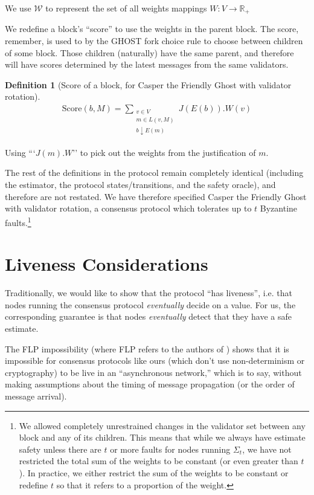 \documentclass{article}
\theoremstyle{definition}
\newtheorem{defn}{Definition}[section]
\begin{document}
We use $\mathcal{W}$ to represent the set of all weights mappings $W:V \to \mathbb{R}_+$

We redefine a block's ``score'' to use the weights in the parent block. The score, remember, is used to by the GHOST fork choice rule to choose between children of some block. Those children (naturally) have the same parent, and therefore will have scores determined by the latest messages from the same validators.

\begin{defn}[Score of a block, for Casper the Friendly Ghost with validator rotation]
\begin{align}
\text{Score}(b, M) = \sum_{\substack{v \in V \\ m \in L(v,M) \\ b \downarrow E(m)}} J(E(b)).W(v)
\end{align}
\end{defn}

Using ```$J(m).W$'' to pick out the weights from the justification of $m$.

The rest of the definitions in the protocol remain completely identical (including the estimator, the protocol states/transitions, and the safety oracle), and therefore are not restated. We have therefore specified Casper the Friendly Ghost with validator rotation, a consensus protocol which tolerates up to $t$ Byzantine faults.\footnote{We allowed completely unrestrained changes in the validator set between any block and any of its children. This means that while we always have estimate safety unless there are $t$ or more faults for nodes running $\Sigma_t$, we have not restricted the total sum of the weights to be constant (or even greater than $t$). In practice, we either restrict the sum of the weights to be constant or redefine $t$ so that it refers to a proportion of the weight.}


\section{Liveness Considerations}

Traditionally, we would like to show that the protocol ``has liveness'', i.e. that nodes running the consensus protocol \emph{eventually} decide on a value. For us, the corresponding guarantee is that nodes \emph{eventually} detect that they have a safe estimate.

The FLP impossibility (where FLP refers to the authors of \cite{Fischer_Lynch_Paterson_FLP_Impossibility_1985}) shows that it is impossible for consensus protocols like ours (which don't use non-determinism or cryptography) to be live in an ``asynchronous network,'' which is to say, without making assumptions about the timing of message propagation (or the order of message arrival).
\end{document}

